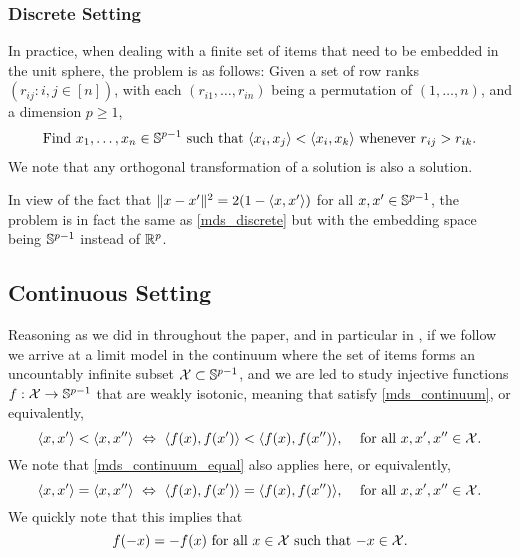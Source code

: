 \documentclass[twoside, 11pt]{article}
\begin{document}
\subsubsection{Discrete Setting}
In practice, when dealing with a finite set of items that need to be embedded in the unit sphere, the problem is as follows:
Given a set of row ranks $(r_{ij} : i, j \in [n])$, with each $(r_{i1}, \dots, r_{in})$ being a permutation of $(1, \dots, n)$, and a dimension $p \ge 1$, 
\begin{equation}
\begin{gathered}
\text{Find $x_1, \dots, x_n \in \mathbb{S}^{p-1}$ such that $\langle x_i, x_j\rangle < \langle x_i, x_k\rangle$ whenever $r_{ij} > r_{ik}$.}
\end{gathered}
\end{equation}
We note that any orthogonal transformation of a solution is also a solution.

In view of the fact that $\|x - x'\|^2 = 2 (1-\langle x, x'\rangle)$ for all $x, x' \in \mathbb{S}^{p-1}$, the problem is in fact the same as \eqref{mds_discrete} but with the embedding space being $\mathbb{S}^{p-1}$ instead of $\mathbb{R}^p$.  

\subsection{Continuous Setting}
Reasoning as we did in throughout the paper, and in particular in , if we follow \citet{shepard1966metric} we arrive at a limit model in the continuum where the set of items forms an uncountably infinite subset $\mathcal{X} \subset \mathbb{S}^{p-1}$, and we are led to study injective functions $f : \mathcal{X} \to \mathbb{S}^{p-1}$ that are weakly isotonic, meaning that satisfy \eqref{mds_continuum}, or equivalently,
\begin{equation} \label{mds vector continuum}
\text{$\langle x, x'\rangle < \langle x,x''\rangle \ \Leftrightarrow \  \langle f(x),f(x')\rangle < \langle f(x),f(x'')\rangle$, \quad for all $x, x', x'' \in \mathcal{X}$.}
\end{equation}
We note that \eqref{mds_continuum_equal} also applies here, or equivalently,
\begin{equation}
\label{mds vector continuum equal}
\text{$\langle x, x'\rangle = \langle x,x''\rangle \ \Leftrightarrow \  \langle f(x),f(x')\rangle = \langle f(x),f(x'')\rangle$, \quad for all $x, x', x'' \in \mathcal{X}$.}
\end{equation}
We quickly note that this implies that 
\begin{equation}
\label{mds vector continuum opposites}
\text{$f(-x) = -f(x)$ for all $x \in \mathcal{X}$ such that $-x \in \mathcal{X}$.}
\end{equation}
\end{document}

